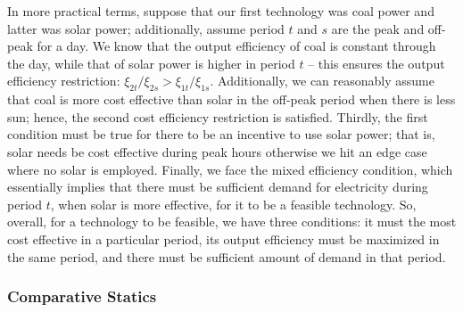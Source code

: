 \documentclass[11pt,a4paper]{extarticle}
\begin{document}
In more practical terms, suppose that our first technology was coal power and latter was solar power; additionally, assume period $t$ and $s$ are the peak and off-peak for a day. We know that the output efficiency of coal is constant through the day, while that of solar power is higher in period $t$ -- this ensures the output efficiency restriction: $\xi_{2t}/\xi_{2s} > \xi_{1t}/\xi_{1s}$. Additionally, we can reasonably assume that coal is more cost effective than solar in the off-peak period when there is less sun; hence, the second cost efficiency restriction is satisfied. Thirdly, the first condition must be true for there to be an incentive to use solar power; that is, solar needs be cost effective during peak hours otherwise we hit an edge case where no solar is employed. Finally, we face the mixed efficiency condition, which essentially implies that there must be sufficient demand for electricity during period $t$, when solar is more effective, for it to be a feasible technology. So, overall, for a technology to be feasible, we have three conditions: it must the most cost effective in a particular period, its output efficiency must be maximized in the same period, and there must be sufficient amount of demand in that period. 



\subsubsection{Comparative Statics}
\end{document}

